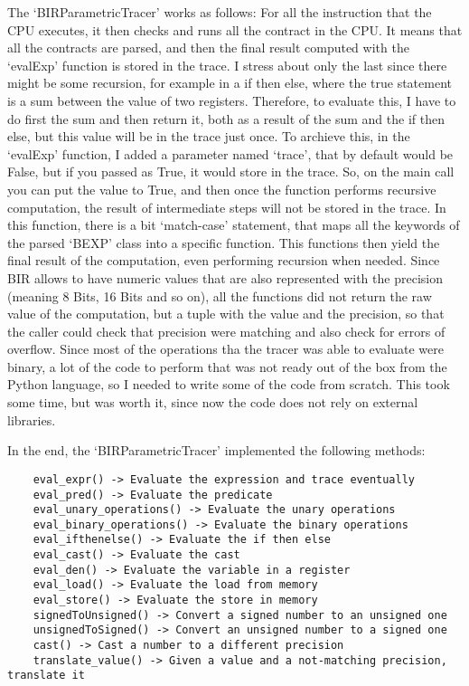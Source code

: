 The `BIRParametricTracer' works as follows: For all the instruction that the CPU
executes, it then checks and runs all the contract in the CPU. It means that all
the contracts are parsed, and then the final result computed with the `evalExp'
function is stored in the trace. I stress about only the last since there might be
some recursion, for example in a if then else, where the true statement is a sum
between the value of two registers. Therefore, to evaluate this, I have to do
first the sum and then return it, both as a result of the sum and the if then else,
but this value will be in the trace just once. To archieve this, in the `evalExp'
function, I added a parameter named `trace', that by default would be False, but
if you passed as True, it would store in the trace. So, on the main call you can
put the value to True, and then once the function performs recursive computation,
the result of intermediate steps will not be stored in the trace. In this function,
there is a bit `match-case' statement, that maps all the keywords of the parsed `BEXP'
class into a specific function. This functions then yield the final result of
the computation, even performing recursion when needed. Since BIR allows to have
numeric values that are also represented with the precision (meaning 8 Bits, 16
Bits and so on), all the functions did not return the raw value of the
computation, but a tuple with the value and the precision, so that the caller
could check that precision were matching and also check for errors of overflow. Since
most of the operations tha the tracer was able to evaluate were binary, a lot of
the code to perform that was not ready out of the box from the Python language, so
I needed to write some of the code from scratch. This took some time, but was worth
it, since now the code does not rely on external libraries.

In the end, the `BIRParametricTracer' implemented the following methods:
\begin{verbatim}
    eval_expr() -> Evaluate the expression and trace eventually
    eval_pred() -> Evaluate the predicate
    eval_unary_operations() -> Evaluate the unary operations 
    eval_binary_operations() -> Evaluate the binary operations
    eval_ifthenelse() -> Evaluate the if then else
    eval_cast() -> Evaluate the cast
    eval_den() -> Evaluate the variable in a register
    eval_load() -> Evaluate the load from memory
    eval_store() -> Evaluate the store in memory
    signedToUnsigned() -> Convert a signed number to an unsigned one
    unsignedToSigned() -> Convert an unsigned number to a signed one
    cast() -> Cast a number to a different precision
    translate_value() -> Given a value and a not-matching precision, translate it
\end{verbatim}

